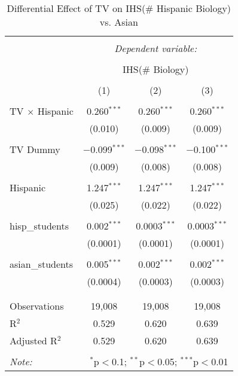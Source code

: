 
\begin{table}[!htbp] \centering 
  \caption{Differential Effect of TV on IHS(\# Hispanic Biology) vs. Asian} 
  \label{} 
\begin{tabular}{@{\extracolsep{-2pt}}lccc} 
\\[-1.8ex]\hline 
\hline \\[-1.8ex] 
 & \multicolumn{3}{c}{\textit{Dependent variable:}} \\ 
\cline{2-4} 
\\[-1.8ex] & \multicolumn{3}{c}{IHS(\# Biology)} \\ 
\\[-1.8ex] & (1) & (2) & (3)\\ 
\hline \\[-1.8ex] 
 TV $\times$ Hispanic & 0.260$^{***}$ & 0.260$^{***}$ & 0.260$^{***}$ \\ 
  & (0.010) & (0.009) & (0.009) \\ 
  & & & \\ 
 TV Dummy & $-$0.099$^{***}$ & $-$0.098$^{***}$ & $-$0.100$^{***}$ \\ 
  & (0.009) & (0.008) & (0.008) \\ 
  & & & \\ 
 Hispanic & 1.247$^{***}$ & 1.247$^{***}$ & 1.247$^{***}$ \\ 
  & (0.025) & (0.022) & (0.022) \\ 
  & & & \\ 
 hisp\_students & 0.002$^{***}$ & 0.0003$^{***}$ & 0.0003$^{***}$ \\ 
  & (0.0001) & (0.0001) & (0.0001) \\ 
  & & & \\ 
 asian\_students & 0.005$^{***}$ & 0.002$^{***}$ & 0.002$^{***}$ \\ 
  & (0.0004) & (0.0003) & (0.0003) \\ 
  & & & \\ 
\hline \\[-1.8ex] 
Observations & 19,008 & 19,008 & 19,008 \\ 
R$^{2}$ & 0.529 & 0.620 & 0.639 \\ 
Adjusted R$^{2}$ & 0.529 & 0.620 & 0.639 \\ 
\hline 
\hline \\[-1.8ex] 
\textit{Note:}  & \multicolumn{3}{r}{$^{*}$p$<$0.1; $^{**}$p$<$0.05; $^{***}$p$<$0.01} \\ 
\end{tabular} 
\end{table} 
